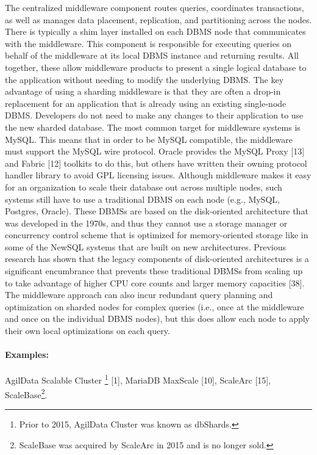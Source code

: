 \documentclass[a4paper,11pt,twoside,openright]{article}
\begin{document}
The centralized middleware component routes queries, coordinates
transactions, as well as manages data placement, replication, and
partitioning across the nodes. There is typically a shim layer installed
on each DBMS node that communicates with the middleware. This component
is responsible for executing queries on behalf of the middleware at its
local DBMS instance and returning results. All together, these allow
middleware products to present a single logical database to the
application without needing to modify the underlying DBMS. The key
advantage of using a sharding middleware is that they are often a
drop-in replacement for an application that is already using an existing
single-node DBMS. Developers do not need to make any changes to their
application to use the new sharded database. The most common target for
middleware systems is MySQL. This means that in order to be MySQL
compatible, the middleware must support the MySQL wire protocol. Oracle
provides the MySQL Proxy {[}13{]} and Fabric {[}12{]} toolkits to do
this, but others have written their owning protocol handler library to
avoid GPL licensing issues. Although middleware makes it easy for an
organization to scale their database out across multiple nodes, such
systems still have to use a traditional DBMS on each node (e.g., MySQL,
Postgres, Oracle). These DBMSs are based on the disk-oriented
architecture that was developed in the 1970s, and thus they cannot use a
storage manager or concurrency control scheme that is optimized for
memory-oriented storage like in some of the NewSQL systems that are
built on new architectures. Previous research has shown that the legacy
components of disk-oriented architectures is a significant encumbrance
that prevents these traditional DBMSs from scaling up to take advantage
of higher CPU core counts and larger memory capacities {[}38{]}. The
middleware approach can also incur redundant query planning and
optimization on sharded nodes for complex queries (i.e., once at the
middleware and once on the individual DBMS nodes), but this does allow
each node to apply their own local optimizations on each query.

\paragraph*{Examples:} AgilData Scalable Cluster \footnote{Prior to 2015, AgilData
  Cluster was known as dbShards.} {[}1{]}, MariaDB MaxScale {[}10{]},
ScaleArc {[}15{]}, ScaleBase\footnote{ScaleBase was acquired by ScaleArc
  in 2015 and is no longer sold.}.
\end{document}
